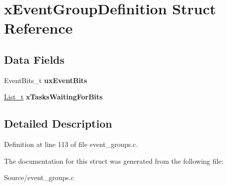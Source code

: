 \hypertarget{structx_event_group_definition}{}\section{x\+Event\+Group\+Definition Struct Reference}
\label{structx_event_group_definition}
\subsection*{Data Fields}
\begin{DoxyCompactItemize}
\item 
\hypertarget{structx_event_group_definition_a518ab52c1060afbc5ca27d6d904be9e1}{}Event\+Bits\+\_\+t {\bfseries ux\+Event\+Bits}\label{structx_event_group_definition_a518ab52c1060afbc5ca27d6d904be9e1}

\item 
\hypertarget{structx_event_group_definition_a3cad6f30679ed2f331cdcac8e0698525}{}\hyperlink{structx_l_i_s_t}{List\+\_\+t} {\bfseries x\+Tasks\+Waiting\+For\+Bits}\label{structx_event_group_definition_a3cad6f30679ed2f331cdcac8e0698525}

\end{DoxyCompactItemize}


\subsection{Detailed Description}


Definition at line 113 of file event\+\_\+groups.\+c.



The documentation for this struct was generated from the following file\+:\begin{DoxyCompactItemize}
\item 
Source/event\+\_\+groups.\+c\end{DoxyCompactItemize}
